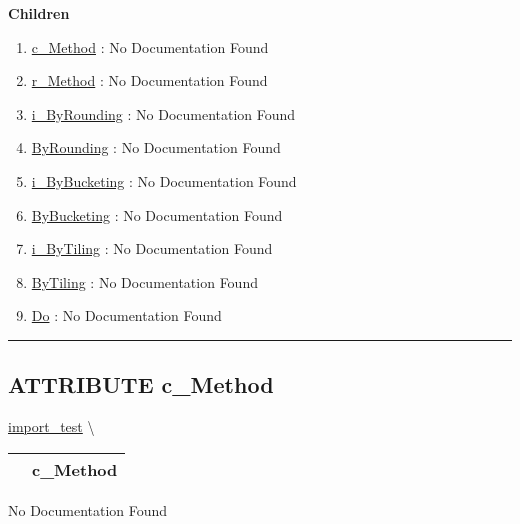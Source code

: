 \textbf{Children}
\begin{enumerate}
\item \hyperlink{ecldoc:ecldoc-c_Method}{c\_Method}
: No Documentation Found
\item \hyperlink{ecldoc:ml_core.discretize.r_method}{r\_Method}
: No Documentation Found
\item \hyperlink{ecldoc:ml_core.discretize.i_byrounding}{i\_ByRounding}
: No Documentation Found
\item \hyperlink{ecldoc:ml_core.discretize.byrounding}{ByRounding}
: No Documentation Found
\item \hyperlink{ecldoc:ml_core.discretize.i_bybucketing}{i\_ByBucketing}
: No Documentation Found
\item \hyperlink{ecldoc:ml_core.discretize.bybucketing}{ByBucketing}
: No Documentation Found
\item \hyperlink{ecldoc:ml_core.discretize.i_bytiling}{i\_ByTiling}
: No Documentation Found
\item \hyperlink{ecldoc:ml_core.discretize.bytiling}{ByTiling}
: No Documentation Found
\item \hyperlink{ecldoc:ml_core.discretize.do}{Do}
: No Documentation Found
\end{enumerate}

\rule{\linewidth}{0.5pt}

\subsection*{\textsf{\colorbox{headtoc}{\color{white} ATTRIBUTE}
c\_Method}}

\hypertarget{ecldoc:ecldoc-c_Method}{}
\hspace{0pt} \hyperlink{ecldoc:ML_Core.Discretize}{import_test} \textbackslash 

{\renewcommand{\arraystretch}{1.5}
\begin{tabularx}{\textwidth}{|>{\raggedright\arraybackslash}l|X|}
\hline
\hspace{0pt}\mytexttt{\color{red} } & \textbf{c\_Method} \\
\hline
\end{tabularx}
}

\par





No Documentation Found








